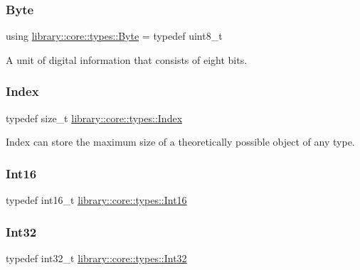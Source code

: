 \subsubsection{\texorpdfstring{Byte}{Byte}}
{\footnotesize\ttfamily using \hyperlink{namespacelibrary_1_1core_1_1types_ae37635b89098069fb3b8c5181edd0945}{library\+::core\+::types\+::\+Byte} = typedef uint8\+\_\+t}



A unit of digital information that consists of eight bits. 

\mbox{\label{namespacelibrary_1_1core_1_1types_ad87eeb821d7067ec94e06ed1980d6350}} 
\subsubsection{\texorpdfstring{Index}{Index}}
{\footnotesize\ttfamily typedef size\+\_\+t \hyperlink{namespacelibrary_1_1core_1_1types_ad87eeb821d7067ec94e06ed1980d6350}{library\+::core\+::types\+::\+Index}}



Index can store the maximum size of a theoretically possible object of any type. 

\mbox{\label{namespacelibrary_1_1core_1_1types_a150247fa2cd1b258b8e5950efcaecfc9}} 
\subsubsection{\texorpdfstring{Int16}{Int16}}
{\footnotesize\ttfamily typedef int16\+\_\+t \hyperlink{namespacelibrary_1_1core_1_1types_a150247fa2cd1b258b8e5950efcaecfc9}{library\+::core\+::types\+::\+Int16}}

\mbox{\label{namespacelibrary_1_1core_1_1types_acaf2598d96f2239dc55e54628da77876}} 
\subsubsection{\texorpdfstring{Int32}{Int32}}
{\footnotesize\ttfamily typedef int32\+\_\+t \hyperlink{namespacelibrary_1_1core_1_1types_acaf2598d96f2239dc55e54628da77876}{library\+::core\+::types\+::\+Int32}}

